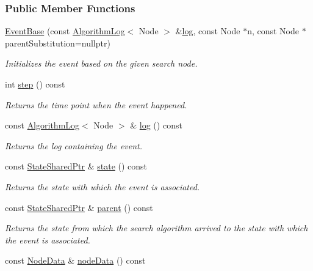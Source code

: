 \subsubsection*{Public Member Functions}
\begin{DoxyCompactItemize}
\item 
\hyperlink{structEventBase_ab487418d5afc7ce4eee766be71e74d8e}{Event\+Base} (const \hyperlink{structAlgorithmLog}{Algorithm\+Log}$<$ Node $>$ \&\hyperlink{structEventBase_a1b9a3278dcc15bd83c9eed1d6fcb587f}{log}, const Node $\ast$n, const Node $\ast$parent\+Substitution=nullptr)
\begin{DoxyCompactList}\small\item\em Initializes the event based on the given search node. \end{DoxyCompactList}\item 
int \hyperlink{structEventBase_a1a7549ab8d4b672a62c608fcbc15f551}{step} () const 
\begin{DoxyCompactList}\small\item\em Returns the time point when the event happened. \end{DoxyCompactList}\item 
const \hyperlink{structAlgorithmLog}{Algorithm\+Log}$<$ Node $>$ \& \hyperlink{structEventBase_a1b9a3278dcc15bd83c9eed1d6fcb587f}{log} () const 
\begin{DoxyCompactList}\small\item\em Returns the log containing the event. \end{DoxyCompactList}\item 
const \hyperlink{structEventBase_a2c0edb5cda08ce1965f3440a97b3fc87}{State\+Shared\+Ptr} \& \hyperlink{structEventBase_a7e1f37b9d452d3771735f842a13204e6}{state} () const 
\begin{DoxyCompactList}\small\item\em Returns the state with which the event is associated. \end{DoxyCompactList}\item 
const \hyperlink{structEventBase_a2c0edb5cda08ce1965f3440a97b3fc87}{State\+Shared\+Ptr} \& \hyperlink{structEventBase_a43ef2e66247acbf1a9432c8fdc6fc78f}{parent} () const 
\begin{DoxyCompactList}\small\item\em Returns the state from which the search algorithm arrived to the state with which the event is associated. \end{DoxyCompactList}\item 
const \hyperlink{structEventBase_a98e31769d6ef4ed8b3f5f0d13cce997b}{Node\+Data} \& \hyperlink{structEventBase_a2022ca71515c8c760bd925e733c07728}{node\+Data} () const 

\end{DoxyCompactItemize}
